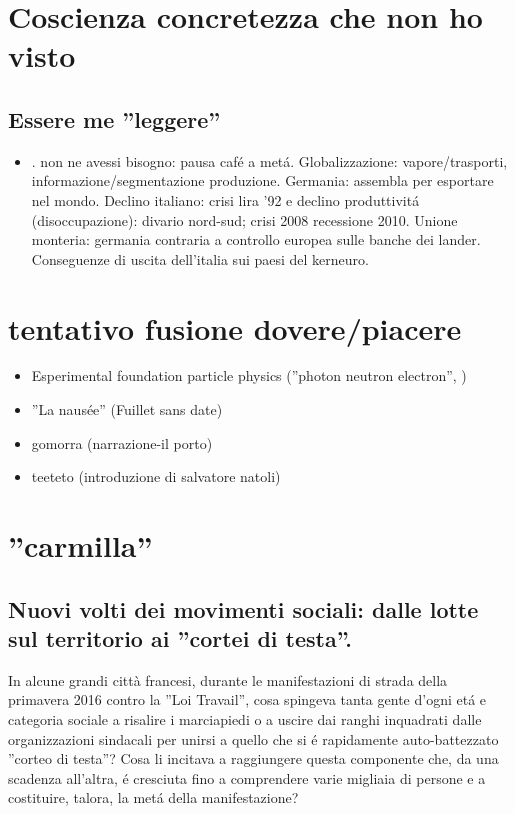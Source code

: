 \section{Coscienza concretezza che non ho visto}

\subsection{Essere me ''leggere''}

\begin{itemize}
    \item \cite{limeseurogeuroitalia}.  non ne avessi bisogno: pausa caf\'e a met\'a. Globalizzazione: vapore/trasporti, informazione/segmentazione produzione. Germania: assembla per esportare nel mondo. Declino italiano: crisi lira '92 e declino produttivit\'a (disoccupazione): divario nord-sud; crisi 2008 recessione 2010. Unione monteria: germania contraria a controllo europea sulle banche dei lander. Conseguenze di uscita dell'italia sui paesi del kerneuro.
    
\end{itemize}

\section{tentativo fusione dovere/piacere}

\begin{itemize}
\item Esperimental foundation particle physics (''photon neutron electron'', )
\item ''La naus\'ee'' (Fuillet sans date)
\item gomorra (narrazione-il porto)
\item teeteto (introduzione di salvatore natoli)

\end{itemize} 

\section{''carmilla''}

\subsection{Nuovi volti dei movimenti sociali: dalle lotte sul territorio ai ''cortei di testa''.}

In alcune grandi città francesi, durante le manifestazioni di strada della primavera 2016 contro la ''Loi Travail'', cosa spingeva tanta gente d’ogni et\'a e categoria sociale a risalire i marciapiedi o a uscire dai ranghi inquadrati dalle organizzazioni sindacali per unirsi a quello che si \'e rapidamente auto-battezzato ''corteo di testa''? Cosa li incitava a raggiungere questa componente che, da una scadenza all’altra, \'e cresciuta fino a comprendere varie migliaia di persone e a costituire, talora, la met\'a della manifestazione?

